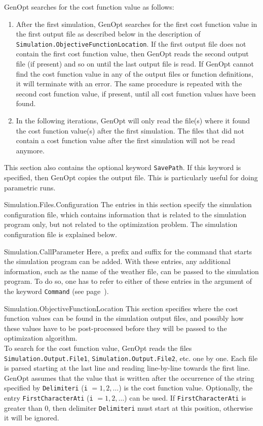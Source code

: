 \begin{codedescription}
\noindent GenOpt searches for the cost function value as follows:
\begin{enumerate}
\item 
After the first simulation, GenOpt searches for the first cost function value in the first output file
as described below in the description of
{\tt Simulation.ObjectiveFunctionLocation}.
If the first output file does not contain the first cost function value,
then GenOpt reads the second output file (if present) and so on until 
the last output file is read. 
If GenOpt cannot find the cost function value in any of the output files or function definitions, it will terminate with an error. The same procedure is repeated with the second cost function value, if present, until all cost function values have been found.
\item
In the following iterations, GenOpt will only read the file(s) where it found the cost function value(s) after the first simulation.
The files that did not contain a cost function value after the first simulation
will not be read anymore.
\end{enumerate}
This section also contains the optional keyword \verb$SavePath$.
If this keyword is specified, 
then GenOpt copies the output file.
This is particularly useful for doing parametric runs.
\item[Simulation.Files.Configuration]
The entries in this section specify the simulation configuration file, which contains information that is related to the simulation program only, but not related to the optimization problem. The simulation configuration file is explained below.
\item[Simulation.CallParameter]
Here, a prefix and suffix for the command that starts the simulation program can be added. With these entries, any additional information, 
such as the name of the weather file,
can be passed to the simulation program.
To do so, one has to refer to either of these entries in the argument of the keyword \verb$Command$ (see page~\pageref{key:com}).
\item[Simulation.ObjectiveFunctionLocation]
\label{sec:objFunLoc}
This section specifies where the cost function values 
can be found in the simulation output files,
and possibly how these values have to be post-processed before they will be passed to the optimization algorithm.\\

To search for the cost function value, GenOpt reads the files
{\tt Simulation.Output.File1}, {\tt Simulation.Output.File2}, etc. one by one.
Each file is parsed starting at the last line and reading line-by-line towards 
the first line.
GenOpt assumes that the value that is written after the occurrence
of the string specified by \verb$Delimiteri$ (\verb$i$ $=1, 2, \ldots$)
is the cost function value.
Optionally, the entry \verb$FirstCharacterAti$ (\verb$i$ $=1, 2, \ldots$) can be used.
If \verb$FirstCharacterAti$ is greater than $0$, then delimiter \verb$Delimiteri$ must 
start at this position, otherwise it will be ignored.


\end{codedescription}
